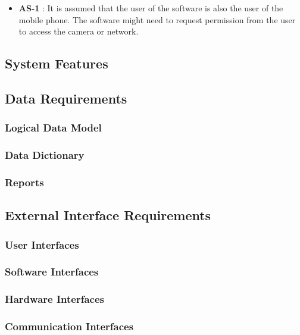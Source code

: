                     \noindent
                    \begin{itemize}[leftmargin=*]
                        \item[]  \textbf{AS-1} : It is assumed that the user of the software is also the user of the mobile phone. The software might need to request permission from the user to access the camera or network.

                    \end{itemize}


    \subsection{System Features}
        

    \subsection{Data Requirements}
        \subsubsection{Logical Data Model}
        \subsubsection{Data Dictionary}
        \subsubsection{Reports}

    \subsection{External Interface Requirements}
        \subsubsection{User Interfaces}
        \subsubsection{Software Interfaces}
        \subsubsection{Hardware Interfaces}
        \subsubsection{Communication Interfaces}







